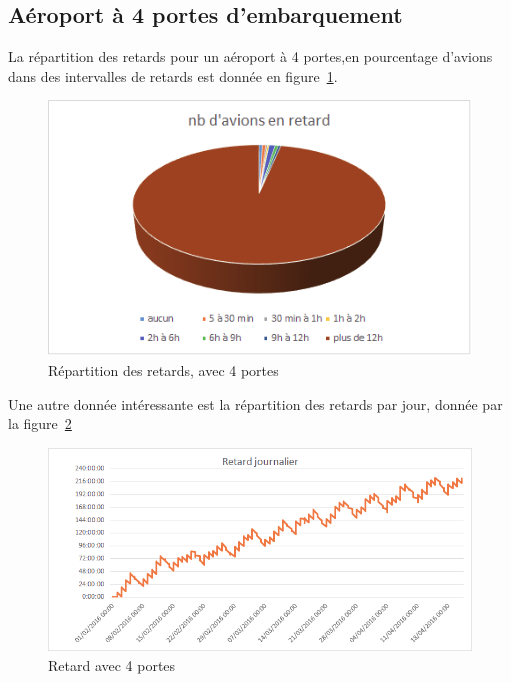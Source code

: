 \subsection{Aéroport à 4 portes d'embarquement}
La répartition des retards pour un aéroport à 4 portes,en pourcentage d'avions dans des intervalles de retards est donnée en figure~\ref{retard_camenbert_4}.
  \graphicspath{{donnees/graph_90jours/4portes/}}
\begin{figure}[H]
 \centering \includegraphics[scale=0.6]{retard_avions.png}
 \caption{\label{retard_camenbert_4} Répartition des retards, avec 4 portes} 
\end{figure}
 
 Une autre donnée intéressante est la répartition des retards par jour, donnée par la figure~\ref{retard_jour_4}
\begin{figure}[H]
\centering \includegraphics[scale=0.6]{retard_jours.png}
 \caption{\label{retard_jour_4} Retard avec 4 portes} 
\end{figure}
 
